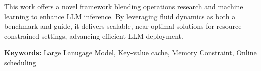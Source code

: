 \documentclass{article}
\begin{document}
This work offers a novel framework blending operations research and machine learning to enhance LLM inference. By leveraging fluid dynamics as both a benchmark and guide, it delivers scalable, near-optimal solutions for resource-constrained settings, advancing efficient LLM deployment.

\textbf{Keywords:} Large Lanugage Model, Key-value cache, Memory Constraint, Online scheduling
\end{document}
